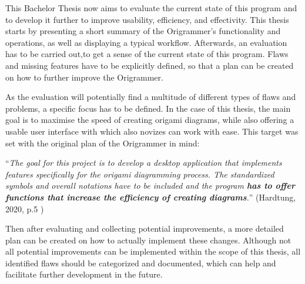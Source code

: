 This Bachelor Thesis now aims to evaluate the current state of this program and to develop it further to improve usability, efficiency, and effectivity. This thesis starts by presenting a short summary of the Origrammer's functionality and operations, as well as displaying a typical workflow. Afterwards, an evaluation has to be carried out,to get a sense of the current state of this program. Flaws and missing features have to be explicitly defined, so that a plan can be created on how to further improve the Origrammer.

As the evaluation will potentially find a multitude of different types of flaws and problems, a specific focus has to be defined. In the case of this thesis, the main goal is to maximise the speed of creating origami diagrams, while also offering a usable user interface with which also novizes can work with ease. This target was set with the original plan of the Origrammer in mind:

\begin{center}
\enquote{\emph{The goal for this project is to develop a desktop application that implements features specifically for the origami diagramming process. The standardized symbols and overall notations have to be included and the program \textbf{has to offer functions that increase the efficiency of creating diagrams}.}} (Hardtung, 2020, p.5 \cite{origrammer})
\end{center}

\noindent Then after evaluating and collecting potential improvements, a more detailed plan can be created on how to actually implement these changes. Although not all potential improvements can be implemented within the scope of this thesis, all identified flaws should be categorized and documented, which can help and facilitate further development in the future.